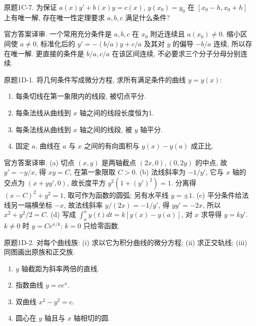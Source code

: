 \begin{exercise}\label{cw:bank-1C-7}
原题1C-7. 为保证 $a(x)y'+b(x)y=c(x)$, $y(x_0)=y_0$ 在 $[x_0-h,x_0+h]$ 上有唯一解, 存在唯一性定理要求 $a,b,c$ 满足什么条件?
\end{exercise}
\begin{solution}
官方答案译审. 一个常用充分条件是 $a,b,c$ 在 $x_0$ 附近连续且 $a(x_0)\ne0$. 缩小区间使 $a\ne0$, 标准化后的 $y'=-(b/a)y+c/a$ 及其对 $y$ 的偏导 $-b/a$ 连续, 所以存在唯一解. 更直接的条件是 $b/a,c/a$ 在该区间连续, 不必要求三个分子分母分别连续.
\end{solution}
\begin{exercise}\label{cw:bank-1D-1}
原题1D-1. 将几何条件写成微分方程, 求所有满足条件的曲线 $y=y(x)$:
\begin{enumerate}[label=\alph*)]
\item 每条切线在第一象限内的线段, 被切点平分.
\item 每条法线从曲线到 $x$ 轴之间的线段长度恒为1.
\item 每条法线从曲线到 $x$ 轴之间的线段, 被 $y$ 轴平分.
\item 固定 $a$, 曲线在 $a$ 与 $x$ 之间的有向面积与 $y(x)-y(a)$ 成正比.
\end{enumerate}
\end{exercise}
\begin{solution}
官方答案译审. (a) 切点 $(x,y)$ 是两轴截点 $(2x,0),(0,2y)$ 的中点, 故 $y'=-y/x$, 得 $xy=C$, 在第一象限取 $C>0$. (b) 法线斜率为 $-1/y'$, 它与 $x$ 轴的交点为 $(x+yy',0)$, 故长度平方 $y^2(1+(y')^2)=1$. 分离得 $(x-C)^2+y^2=1$, 取可作为函数的圆弧; 另有水平线 $y=\pm1$. (c) 平分条件给法线另一端横坐标 $-x$, 故法线斜率 $y/(2x)=-1/y'$, 得 $yy'=-2x$, 所以 $x^2+y^2/2=C$. (d) 写成 $\int_a^x y(t)dt=k[y(x)-y(a)]$, 对 $x$ 求导得 $y=ky'$. $k\ne0$ 时 $y=Ce^{x/k}$; $k=0$ 只给零函数.
\end{solution}
\begin{exercise}\label{cw:bank-1D-2}
原题1D-2. 对每个曲线族: (i) 求以它为积分曲线的微分方程; (ii) 求正交轨线; (iii) 同图画出原族和正交族.
\begin{enumerate}[label=\alph*)]
\item $y$ 轴截距为斜率两倍的直线.
\item 指数曲线 $y=ce^x$.
\item 双曲线 $x^2-y^2=c$.
\item 圆心在 $y$ 轴且与 $x$ 轴相切的圆.
\end{enumerate}
\end{exercise}
